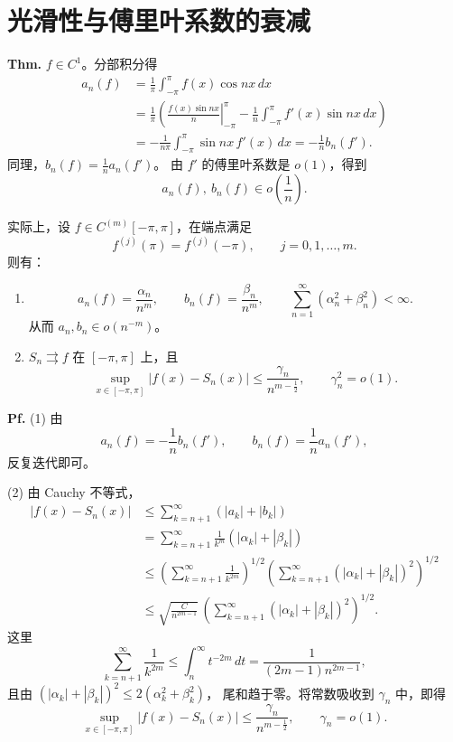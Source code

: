 \documentclass[11pt,a4paper]{ctexart}
\begin{document}
\section*{光滑性与傅里叶系数的衰减}

\noindent\textbf{Thm.}
$f\in C^1$。分部积分得
\begin{align*}
 a_n(f)
 &=\frac{1}{\pi}\int_{-\pi}^{\pi}f(x)\cos nx\,dx\\
 &=\frac{1}{\pi}\left(
 \left.\frac{f(x)\sin nx}{n}\right|_{-\pi}^{\pi}
 -\frac{1}{n}\int_{-\pi}^{\pi}f'(x)\sin nx\,dx\right)\\
 &=-\frac{1}{n\pi}\int_{-\pi}^{\pi}\sin nx\,f'(x)\,dx
 =-\frac{1}{n}b_n(f').
\end{align*}
同理，$b_n(f)=\frac{1}{n}a_n(f')$。
由 $f'$ 的傅里叶系数是 $o(1)$，得到
\[
 a_n(f),\ b_n(f)\in o\!\left(\frac{1}{n}\right).
\]

实际上，设 $f\in C^{(m)}[-\pi,\pi]$，在端点满足
\[
 f^{(j)}(\pi)=f^{(j)}(-\pi),\qquad j=0,1,\ldots,m.
\]
则有：
\begin{enumerate}
\item
\[
 a_n(f)=\frac{\alpha_n}{n^m},\qquad
 b_n(f)=\frac{\beta_n}{n^m},\qquad
 \sum_{n=1}^{\infty}(\alpha_n^2+\beta_n^2)<\infty.
\]
从而 $a_n,b_n\in o(n^{-m})$。
\item $S_n\rightrightarrows f$ 在 $[-\pi,\pi]$ 上，且
\[
 \sup_{x\in[-\pi,\pi]}|f(x)-S_n(x)|
 \leq\frac{\gamma_n}{n^{m-\frac12}},\qquad \gamma_n^2=o(1).
\]
\end{enumerate}

\noindent\textbf{Pf.}
(1) 由
\[
 a_n(f)=-\frac{1}{n}b_n(f'),\qquad
 b_n(f)=\frac{1}{n}a_n(f'),
\]
反复迭代即可。

(2) 由 Cauchy 不等式，
\begin{align*}
 |f(x)-S_n(x)|
 &\leq\sum_{k=n+1}^{\infty}(|a_k|+|b_k|)\\
 &=\sum_{k=n+1}^{\infty}\frac{1}{k^m}
 (|\alpha_k|+|\beta_k|)\\
 &\leq\left(\sum_{k=n+1}^{\infty}\frac{1}{k^{2m}}\right)^{1/2}
 \left(\sum_{k=n+1}^{\infty}(|\alpha_k|+|\beta_k|)^2\right)^{1/2}\\
 &\leq\sqrt{\frac{C}{n^{2m-1}}}\,
 \left(\sum_{k=n+1}^{\infty}(|\alpha_k|+|\beta_k|)^2\right)^{1/2}.
\end{align*}
这里
\[
 \sum_{k=n+1}^{\infty}\frac{1}{k^{2m}}
 \leq\int_n^{\infty}t^{-2m}\,dt
 =\frac{1}{(2m-1)n^{2m-1}},
\]
且由 $(|\alpha_k|+|\beta_k|)^2\leq2(\alpha_k^2+\beta_k^2)$，
尾和趋于零。将常数吸收到 $\gamma_n$ 中，即得
\[
 \sup_{x\in[-\pi,\pi]}|f(x)-S_n(x)|
 \leq\frac{\gamma_n}{n^{m-\frac12}},\qquad\gamma_n=o(1).
\]
\end{document}

